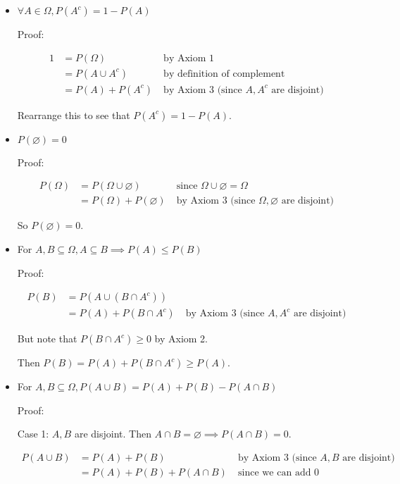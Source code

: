 \documentclass[a4paper,10pt]{article}
\newcommand{\ind}{\leavevmode{\parindent=1em\indent}}
\begin{document}
\begin{itemize}
    \item $\forall A \in \Omega, P(A^c) = 1 - P(A)$

        Proof:

        \begin{align*}
            1 &= P(\Omega)\;&\text{by Axiom 1} \\
              &= P(A\cup A^c)\;&\text{by definition of complement} \\
              &= P(A) + P(A^c)\;&\text{by Axiom 3 (since $A, A^c$ are disjoint)} 
        \end{align*}

        Rearrange this to see that $P(A^c) = 1 - P(A)$. 

    \item $P(\varnothing) = 0$

        Proof: 

        \begin{align*}
            P(\Omega) &= P(\Omega \cup \varnothing)\;&\text{since $\Omega \cup \varnothing = \Omega$} \\
                      &= P(\Omega) + P(\varnothing)\;&\text{by Axiom 3 (since $\Omega, \varnothing$ are disjoint)}
        \end{align*}

        So $P(\varnothing) = 0$.

    \item For $A, B \subseteq \Omega, A \subseteq B \implies P(A) \leq P(B)$

        Proof:

        \begin{align*}
            P(B) &= P(A\cup (B\cap A^c)) \\
                 &= P(A) + P(B\cap A^c)\;&\text{by Axiom 3 (since $A, A^c$ are disjoint)}
        \end{align*}
        
        But note that $P(B\cap A^c) \geq 0$ by Axiom 2. 

        Then $P(B) = P(A) + P(B\cap A^c) \geq P(A)$. 

    \item For $A, B \subseteq \Omega, P(A\cup B) = P(A) + P(B) - P(A\cap B)$

        Proof:

        \ind Case 1: $A, B$ are disjoint. Then $A\cap B = \varnothing \implies P(A\cap B) = 0$. 

        \begin{align*}
            P(A\cup B) &= P(A) + P(B)\;&\text{by Axiom 3 (since $A, B$ are disjoint)} \\
                       &= P(A) + P(B) + P(A\cap B)\;&\text{since we can add 0 wherever we want}
        \end{align*}


\end{itemize}
\end{document}
